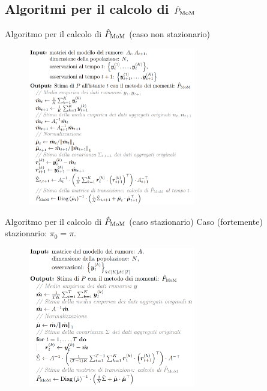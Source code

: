 \documentclass[10pt,xcolor={table,dvipsnames}]{beamer} 		%
\theoremstyle{plain}					%
\theoremstyle{definition}
\theoremstyle{remark}
\begin{document}
    \subsection{Algoritmi per il calcolo di \texorpdfstring{$\hat{P}_{\textup{MoM}}$}{P}}

	\begin{frame}[fragile]
		{Algoritmo per il calcolo di $\hat{P}_{\textup{MoM}}$ {\smaller (caso non stazionario)}}

		\begin{figure}[ht]
			\centering
			\includegraphics[width=0.65\textwidth]{Immagini/algorithm_nonstationary.png}
		\end{figure}
		
	\end{frame}

	\begin{frame}[fragile]
		{Algoritmo per il calcolo di $\hat{P}_{\textup{MoM}}$ {\smaller (caso stazionario)}}
		Caso {\smaller (fortemente)} stazionario: $\pi_0=\pi$.

		\begin{figure}[ht]
			\centering
			\includegraphics[width=0.65\textwidth]{Immagini/algorithm_stationary.png}
		\end{figure}
		
	\end{frame}
\end{document}
